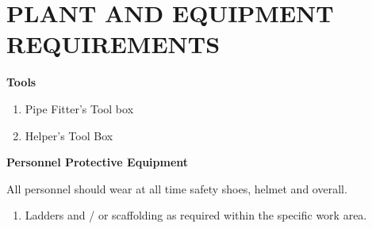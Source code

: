 \section{PLANT AND EQUIPMENT REQUIREMENTS}

{\bf{Tools}}

\begin{enumerate}
\item Pipe Fitter’s Tool box
\item Helper’s Tool Box
\end{enumerate}


{\bf{Personnel Protective Equipment}}

 All personnel should wear at all time safety shoes, helmet and overall.

\begin{enumerate}
\item	Ladders and / or scaffolding as required within the specific work area.
\end{enumerate}





